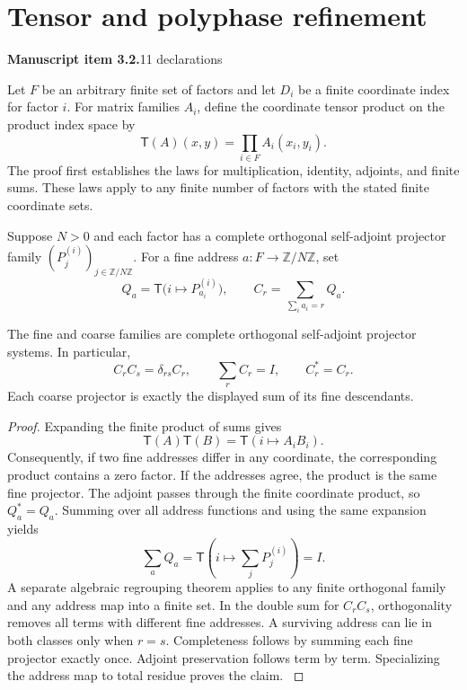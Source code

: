 \section{Tensor and polyphase refinement}\label{supp2:section:002}
\textbf{Manuscript item 3.2.}\quad {}\hfill 11 declarations

Let $F$ be an arbitrary finite set of factors and let $D_i$ be a finite coordinate index for factor $i$. For matrix families $A_i$, define the coordinate tensor product on the product index space by
\[
 \mathsf T(A)(x,y)=\prod_{i\in F} A_i(x_i,y_i).
\]
The proof first establishes the laws for multiplication, identity, adjoints, and finite sums. These laws apply to any finite number of factors with the stated finite coordinate sets.

Suppose $N>0$ and each factor has a complete orthogonal self-adjoint projector family $(P^{(i)}_j)_{j\in\mathbb Z/N\mathbb Z}$. For a fine address $a:F\to\mathbb Z/N\mathbb Z$, set
\[
 Q_a=\mathsf T\bigl(i\mapsto P^{(i)}_{a_i}\bigr),
 \qquad
 C_r=\sum_{\sum_i a_i=r}Q_a.
\]

\begin{statement}\label{supp2:statement:002}
The fine and coarse families are complete orthogonal self-adjoint projector systems. In particular,
\[
 C_rC_s=\delta_{rs}C_r,\qquad
 \sum_r C_r=I,\qquad C_r^*=C_r.
\]
Each coarse projector is exactly the displayed sum of its fine descendants.
\end{statement}

\begin{proof}\label{supp2:proof:002}
Expanding the finite product of sums gives
\[
 \mathsf T(A)\mathsf T(B)=\mathsf T(i\mapsto A_iB_i).
\]
Consequently, if two fine addresses differ in any coordinate, the corresponding product contains a zero factor. If the addresses agree, the product is the same fine projector. The adjoint passes through the finite coordinate product, so $Q_a^*=Q_a$. Summing over all address functions and using the same expansion yields
\[
 \sum_a Q_a=\mathsf T\left(i\mapsto\sum_jP^{(i)}_j\right)=I.
\]
A separate algebraic regrouping theorem applies to any finite orthogonal family and any address map into a finite set. In the double sum for $C_rC_s$, orthogonality removes all terms with different fine addresses. A surviving address can lie in both classes only when $r=s$. Completeness follows by summing each fine projector exactly once. Adjoint preservation follows term by term. Specializing the address map to total residue proves the claim.
\label{supp2:proof:002:end}\end{proof}

